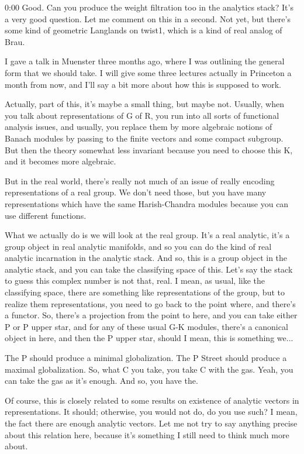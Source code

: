 \begin{unfinished}{0:00}
Good. Can you produce the weight filtration too in the analytics stack? It's a very good question. Let me comment on this in a second. Not yet, but there's some kind of geometric Langlands on twist1, which is a kind of real analog of Brau.

I gave a talk in Muenster three months ago, where I was outlining the general form that we should take. I will give some three lectures actually in Princeton a month from now, and I'll say a bit more about how this is supposed to work.

Actually, part of this, it's maybe a small thing, but maybe not. Usually, when you talk about representations of G of R, you run into all sorts of functional analysis issues, and usually, you replace them by more algebraic notions of Banach modules by passing to the finite vectors and some compact subgroup. But then the theory somewhat less invariant because you need to choose this K, and it becomes more algebraic.

But in the real world, there's really not much of an issue of really encoding representations of a real group. We don't need those, but you have many representations which have the same Harish-Chandra modules because you can use different functions.

What we actually do is we will look at the real group. It's a real analytic, it's a group object in real analytic manifolds, and so you can do the kind of real analytic incarnation in the analytic stack. And so, this is a group object in the analytic stack, and you can take the classifying space of this. Let's say the stack to guess this complex number is not that, real. I mean, as usual, like the classifying space, there are something like representations of the group, but to realize them representations, you need to go back to the point where, and there's a functor. So, there's a projection from the point to here, and you can take either P or P upper star, and for any of these usual G-K modules, there's a canonical object in here, and then the P upper star, should I mean, this is something we...

The P should produce a minimal globalization. The P Street should produce a maximal globalization. So, what C you take, you take C with the gas. Yeah, you can take the gas as it's enough. And so, you have the.

Of course, this is closely related to some results on existence of analytic vectors in representations. It should; otherwise, you would not do, do you use such? I mean, the fact there are enough analytic vectors. Let me not try to say anything precise about this relation here, because it's something I still need to think much more about.


\end{unfinished}
